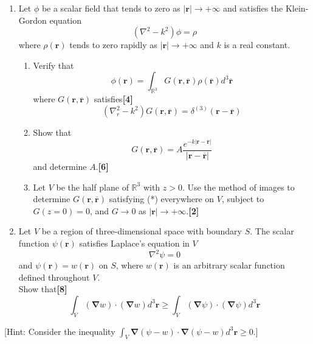\documentclass[a4paper]{article}
\begin{document}
\begin{qns}\leavevmode
\begin{enumerate}[label=(\alph*)]
\item Let $\phi$ be a scalar field that tends to zero as $|\mathbf{r}|\rightarrow+\infty$ and satisfies the Klein-Gordon equation
$$(\nabla^2-k^2)\phi=\rho$$
where $\rho(\mathbf{r})$ tends to zero rapidly as $|\mathbf{r}|\rightarrow+\infty$ and $k$ is a real constant.
\begin{enumerate}[label=(\roman*)]
\item Verify that
$$\phi(\mathbf{r})=\int_{\mathbb{R}^3}G(\mathbf{r},\overline{\mathbf{r}})\rho(\overline{\mathbf{r}})d^3\mathbf{\overline{r}}$$
where $G(\mathbf{r},\mathbf{\overline{r}})$ satisfies\hfill\textbf{[4]}
\begin{equation}
(\nabla_r^2-k^2)G(\mathbf{r},\mathbf{\overline{r}})=\delta^{(3)}(\mathbf{r}-\mathbf{\overline{r}})\tag{*}
\end{equation}
\item Show that
$$G(\mathbf{r},\mathbf{\overline{r}})=A\frac{e^{-k|\mathbf{r}-\mathbf{\overline{r}|}}}{|\mathbf{r}-\mathbf{\overline{r}}|}$$
and determine $A$.\hfill\textbf{[6]}
\item Let $V$ be the half plane of $\mathbb{R}^3$ with $z > 0$. Use the method of images to determine $G(\mathbf{r},\mathbf{\overline{r}})$ satisfying (*) everywhere on $V$, subject to $G(z=0)=0$, and $G\rightarrow0$ as $|\mathbf{r}|\rightarrow+\infty$.\hfill\textbf{[2]}
\end{enumerate}
\item Let $V$ be a region of three-dimensional space with boundary $S$. The scalar function $\psi(\mathbf{r})$ satisfies Laplace’s equation in $V$
$$\nabla^2\psi=0$$
and $\psi(\mathbf{r})=w(\mathbf{r})$ on $S$, where $w(\mathbf{r})$ is an arbitrary scalar function defined throughout $V$.\\[5pt]
Show that\hfill\textbf{[8]}
$$\int_V(\boldsymbol{\nabla}w)\cdot(\boldsymbol{\nabla}w)d^3\mathbf{r}\geq\int_V(\boldsymbol{\nabla}\psi)\cdot(\boldsymbol{\nabla}\psi)d^3\mathbf{r}$$
\end{enumerate}
[Hint: Consider the inequality $\int_V\boldsymbol{\nabla}(\psi-w)\cdot\boldsymbol{\nabla}(\psi-w)d^3\mathbf{r}\geq0$.]
\end{qns}
\newpage
\end{document}

